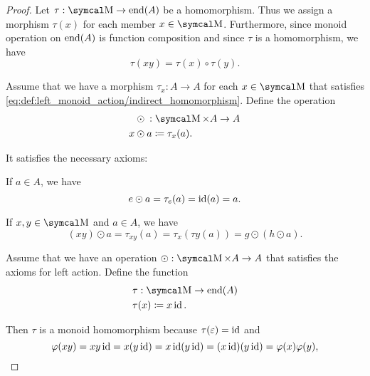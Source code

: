 \begin{proof}
   Let \( \tau: \CM \to \End(A) \) be a homomorphism. Thus we assign a morphism \( \tau(x) \) for each member \( x \in \CM \). Furthermore, since monoid operation on \( \operatorname{end}(A) \) is function composition and since \( \tau \) is a homomorphism, we have
  \begin{equation*}
    \tau(xy) = \tau(x) \circ \tau(y).
  \end{equation*}

   Assume that we have a morphism \( \tau_x: A \to A \) for each \( x \in \CM \) that satisfies \eqref{eq:def:left_monoid_action/indirect_homomorphism}. Define the operation
  \begin{align*}
    {}&\odot{}: \CM \times A \to A \\
    x &\odot a \coloneqq \tau_x(a).
  \end{align*}

  It satisfies the necessary axioms:
  \begin{RefList}
     If \( a \in A \), we have
    \begin{equation*}
      e \odot a
      =
      \tau_e(a)
      =
      \operatorname{id}(a)
      =
      a.
    \end{equation*}

     If \( x, y \in \CM \) and \( a \in A \), we have
    \begin{equation*}
      (x y) \odot a
      =
      \tau_{x y}(a)
      =
      \tau_{x}(\tau{y}(a))
      =
      g \odot (h \odot a).
    \end{equation*}
  \end{RefList}

   Assume that we have an operation \( \odot: \CM \times A \to A \) that satisfies the axioms for left action. Define the function
  \begin{align*}
    &\tau: \CM \to \End(A) \\
    &\tau(x) \coloneqq x \Id.
  \end{align*}

  Then \( \tau \) is a monoid homomorphism because \( \tau(\varepsilon) = \operatorname{id} \) and
  \begin{equation}\label{def:left_monoid_action/homomorphism/proof}
    \varphi(xy)
    =
    xy \operatorname{id}
    =
    x (y \operatorname{id})
    =
    x \operatorname{id} (y \operatorname{id})
    =
    (x \operatorname{id}) (y \operatorname{id})
    =
    \varphi(x) \varphi(y),
  \end{equation}
\end{proof}

